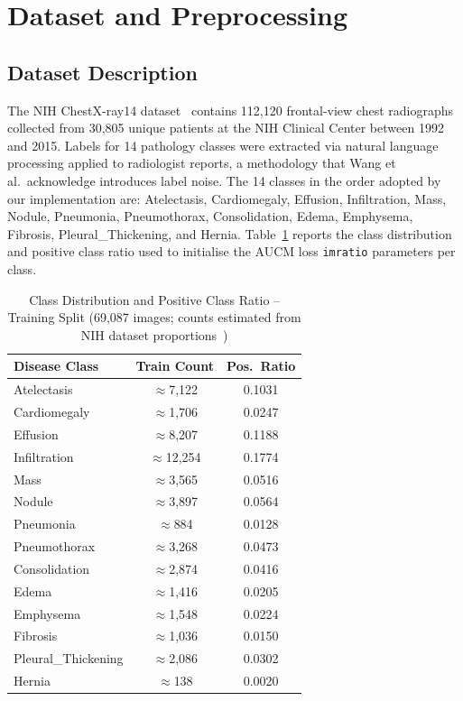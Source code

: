 \documentclass[conference]{IEEEtran}
\begin{document}
\section{Dataset and Preprocessing}

\subsection{Dataset Description}

The NIH ChestX-ray14 dataset~\cite{wang2017} contains 112,120
frontal-view chest radiographs collected from 30,805 unique patients at
the NIH Clinical Center between 1992 and 2015. Labels for 14 pathology
classes were extracted via natural language processing applied to
radiologist reports, a methodology that Wang et al.\ acknowledge
introduces label noise. The 14 classes in the order adopted by our
implementation are: Atelectasis, Cardiomegaly, Effusion, Infiltration,
Mass, Nodule, Pneumonia, Pneumothorax, Consolidation, Edema,
Emphysema, Fibrosis, Pleural\_Thickening, and Hernia.
Table~\ref{tab:class_dist} reports the class distribution and positive
class ratio used to initialise the AUCM loss \texttt{imratio}
parameters per class.

\begin{table}[!t]
\renewcommand{\arraystretch}{1.2}
\caption{Class Distribution and Positive Class Ratio -- Training Split
(69,087 images; counts estimated from NIH dataset proportions~\cite{wang2017})}
\label{tab:class_dist}
\centering
\begin{tabular}{lcc}
\toprule
\textbf{Disease Class} & \textbf{Train Count} & \textbf{Pos.\ Ratio} \\
\midrule
Atelectasis         & $\approx$7,122  & 0.1031 \\
Cardiomegaly        & $\approx$1,706  & 0.0247 \\
Effusion            & $\approx$8,207  & 0.1188 \\
Infiltration        & $\approx$12,254 & 0.1774 \\
Mass                & $\approx$3,565  & 0.0516 \\
Nodule              & $\approx$3,897  & 0.0564 \\
Pneumonia           & $\approx$884    & 0.0128 \\
Pneumothorax        & $\approx$3,268  & 0.0473 \\
Consolidation       & $\approx$2,874  & 0.0416 \\
Edema               & $\approx$1,416  & 0.0205 \\
Emphysema           & $\approx$1,548  & 0.0224 \\
Fibrosis            & $\approx$1,036  & 0.0150 \\
Pleural\_Thickening & $\approx$2,086  & 0.0302 \\
Hernia              & $\approx$138    & 0.0020 \\
\bottomrule
\end{tabular}
\end{table}
\end{document}
